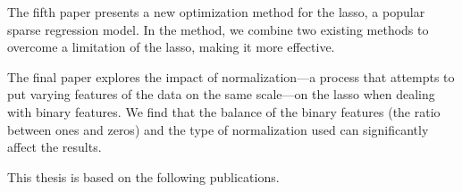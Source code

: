 \documentclass{book}
\newcommand{\PaperIauthor}{Johan Larsson, Małgorzata Bogdan, and Jonas Wallin}
\newcommand{\PaperItitle}{The Strong Screening Rule for SLOPE}
\begin{document}
The fifth paper presents a new optimization method for the lasso, a popular sparse regression model. In the method, we combine two existing methods to overcome a limitation of the lasso, making it more effective.

The final paper explores the impact of normalization---a process that attempts to put varying features of the data on the same scale---on the lasso when dealing with binary features. We find that the balance of the binary features (the ratio between ones and zeros) and the type of normalization used can significantly affect the results.

\label{sec:paperlist}

This thesis is based on the following publications.

\end{document}
